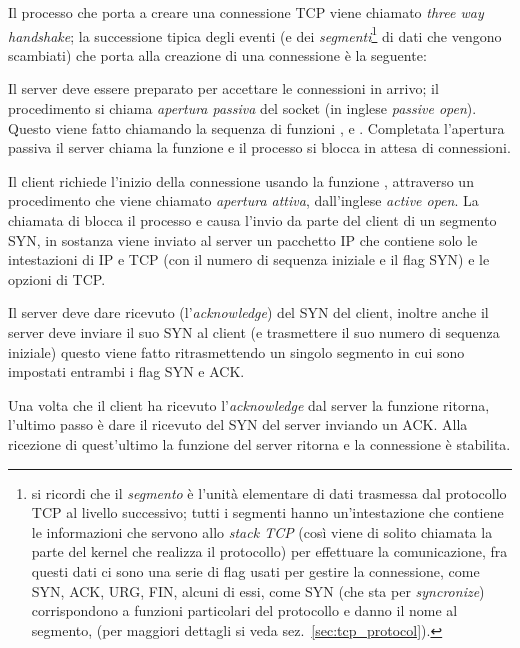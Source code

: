 
Il processo che porta a creare una connessione TCP viene chiamato
\textit{three way handshake}; la successione tipica degli eventi (e dei
\textsl{segmenti}\footnote{si ricordi che il \textsl{segmento} è l'unità
  elementare di dati trasmessa dal protocollo TCP al livello successivo; tutti
  i segmenti hanno un'intestazione che contiene le informazioni che servono
  allo \textit{stack TCP} (così viene di solito chiamata la parte del kernel
  che realizza il protocollo) per effettuare la comunicazione, fra questi dati
  ci sono una serie di flag usati per gestire la connessione, come SYN, ACK,
  URG, FIN, alcuni di essi, come SYN (che sta per \textit{syncronize})
  corrispondono a funzioni particolari del protocollo e danno il nome al
  segmento, (per maggiori dettagli si veda sez.~\ref{sec:tcp_protocol}).}  di
dati che vengono scambiati) che porta alla creazione di una connessione è la
seguente:
 
\begin{enumerate*}
\item Il server deve essere preparato per accettare le connessioni in arrivo;
  il procedimento si chiama \textsl{apertura passiva} del socket (in inglese
  \textit{passive open}). Questo viene fatto chiamando la sequenza di funzioni
  ,  e . Completata l'apertura passiva il
  server chiama la funzione  e il processo si blocca in attesa di
  connessioni.
  
\item Il client richiede l'inizio della connessione usando la funzione
  , attraverso un procedimento che viene chiamato
  \textsl{apertura attiva}, dall'inglese \textit{active open}. La chiamata di
   blocca il processo e causa l'invio da parte del client di un
  segmento SYN, in sostanza viene inviato al server un pacchetto IP che
  contiene solo le intestazioni di IP e TCP (con il numero di sequenza
  iniziale e il flag SYN) e le opzioni di TCP.
  
\item Il server deve dare ricevuto (l'\textit{acknowledge}) del SYN del
  client, inoltre anche il server deve inviare il suo SYN al client (e
  trasmettere il suo numero di sequenza iniziale) questo viene fatto
  ritrasmettendo un singolo segmento in cui sono impostati entrambi i flag SYN
  e ACK.
  
\item Una volta che il client ha ricevuto l'\textit{acknowledge} dal server la
  funzione  ritorna, l'ultimo passo è dare il ricevuto del SYN
  del server inviando un ACK. Alla ricezione di quest'ultimo la funzione
   del server ritorna e la connessione è stabilita.
\end{enumerate*}

